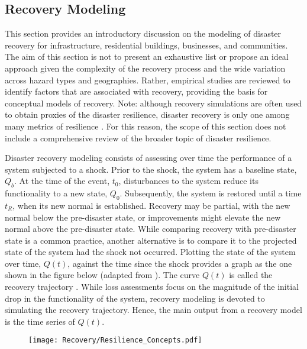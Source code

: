 
\begin{partbacktext}
\part{Recovery Modeling}
\label{part:recovery}

This section provides an introductory discussion on the modeling of disaster recovery for infrastructure, residential buildings, businesses, and communities. The aim of this section is not to present an exhaustive list or propose an ideal approach given the complexity of the recovery process and the wide variation across hazard types and geographies. Rather, empirical studies are reviewed to identify factors that are associated with recovery, providing the basis for conceptual models of recovery. Note: although recovery simulations are often used to obtain proxies of the disaster resilience, disaster recovery is only one among many metrics of resilience \citep{national2019building, kwasinski2016conceptual}. For this reason, the scope of this section does not include a comprehensive review of the broader topic of disaster resilience.

Disaster recovery modeling consists of assessing over time the performance of a system subjected to a shock. Prior to the shock, the system has a baseline state, $Q_b$. At the time of the event, $t_0$, disturbances to the system reduce its functionality to a new state, $Q_0$. Subsequently, the system is restored until a time $t_R$, when its new normal is established. Recovery may be partial, with the new normal below the pre-disaster state, or improvements might elevate the new normal above the pre-disaster state. While comparing recovery with pre-disaster state is a common practice, another alternative is to compare it to the projected state of the system had the shock not occurred. Plotting the state of the system over time, $Q(t)$, against the time since the shock provides a graph as the one shown in the figure below (adapted from \cite{Bruneau2003}). The curve $Q(t)$ is called the recovery trajectory \citep{Bruneau2003}. While loss assessments focus on the magnitude of the initial drop in the functionality of the system, recovery modeling is devoted to simulating the recovery trajectory. Hence, the main output from a recovery model is the time series of $Q(t)$.

\begin{figure}[htb]
    \centering
    \texttt{[image: Recovery/Resilience\_Concepts.pdf]}
    \label{fig:ResilienceTriangle}
\end{figure}


\end{partbacktext}
